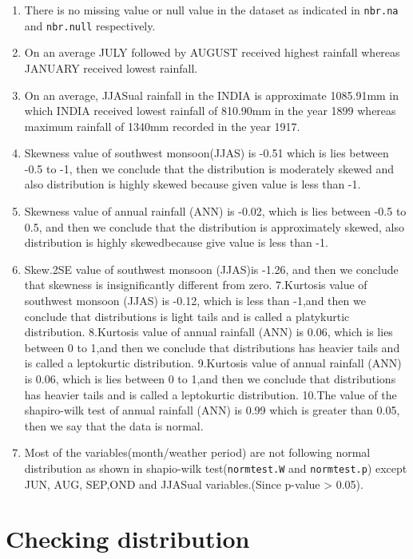 \documentclass[12pt,openany]{book}
\providecommand{\tightlist}{%
  \setlength{\itemsep}{0pt}\setlength{\parskip}{0pt}}
\begin{document}
\begin{enumerate}
\def\labelenumi{\arabic{enumi}.}
\tightlist
\item
  There is no missing value or null value in the dataset as indicated in \texttt{nbr.na} and \texttt{nbr.null} respectively.
\item
  On an average JULY followed by AUGUST received highest rainfall whereas JANUARY received lowest rainfall.
\item
  On an average, JJASual rainfall in the INDIA is approximate 1085.91mm in which INDIA received lowest rainfall of 810.90mm in the year 1899 whereas maximum rainfall of 1340mm recorded in the year 1917.
\item
  Skewness value of southwest monsoon(JJAS) is -0.51 which is lies between -0.5 to -1, then we conclude that the distribution is moderately skewed and also distribution is highly skewed because given value is less than -1.
\item
  Skewness value of annual rainfall (ANN) is -0.02, which is lies between -0.5 to 0.5, and then we conclude that the distribution is approximately skewed, also distribution is highly skewedbecause give value is less than -1.
\item
  Skew.2SE value of southwest monsoon (JJAS)is -1.26, and then we conclude that skewness is insignificantly different from zero.
  7.Kurtosis value of southwest monsoon (JJAS) is -0.12, which is less than -1,and then we conclude that distributions is light tails and is called a platykurtic distribution.
  8.Kurtosis value of annual rainfall (ANN) is 0.06, which is lies between 0 to 1,and then we conclude that distributions has heavier tails and is called a leptokurtic distribution.
  9.Kurtosis value of annual rainfall (ANN) is 0.06, which is lies between 0 to 1,and then we conclude that distributions has heavier tails and is called a leptokurtic distribution.
  10.The value of the shapiro-wilk test of annual rainfall (ANN) is 0.99 which is greater than 0.05, then we say that the data is normal.
\item
  Most of the variables(month/weather period) are not following normal distribution as shown in shapio-wilk test(\texttt{normtest.W} and \texttt{normtest.p}) except JUN, AUG, SEP,OND and JJASual variables.(Since p-value \textgreater{} 0.05).
\end{enumerate}

\hypertarget{checking-distribution}{%
\section{Checking distribution}\label{checking-distribution}}
\end{document}
